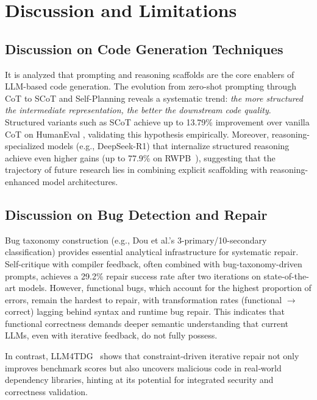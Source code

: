 \documentclass[11pt,a4paper]{article}
\begin{document}
\section{Discussion and Limitations}
\label{sec:discussion}

\subsection{Discussion on Code Generation Techniques}

It is analyzed that prompting and reasoning scaffolds are the core enablers of LLM-based code generation. The evolution from zero-shot prompting through CoT to SCoT and Self-Planning reveals a systematic trend: \textit{the more structured the intermediate representation, the better the downstream code quality}. Structured variants such as SCoT achieve up to 13.79\% improvement over vanilla CoT on HumanEval \cite{li2025scot}, validating this hypothesis empirically. Moreover, reasoning-specialized models (e.g., DeepSeek-R1) that internalize structured reasoning achieve even higher gains (up to 77.9\% on RWPB~\cite{dou2026}), suggesting that the trajectory of future research lies in combining explicit scaffolding with reasoning-enhanced model architectures.

\subsection{Discussion on Bug Detection and Repair}

Bug taxonomy construction (e.g., Dou et al.'s 3-primary/10-secondary classification) provides essential analytical infrastructure for systematic repair. Self-critique with compiler feedback, often combined with bug-taxonomy-driven prompts, achieves a 29.2\% repair success rate after two iterations on state-of-the-art models. However, functional bugs, which account for the highest proportion of errors, remain the hardest to repair, with transformation rates (functional $\to$ correct) lagging behind syntax and runtime bug repair. This indicates that functional correctness demands deeper semantic understanding that current LLMs, even with iterative feedback, do not fully possess.

In contrast, LLM4TDG~\cite{liu2025llm4tdg} shows that constraint‑driven iterative repair not only improves benchmark scores but also uncovers malicious code in real‑world dependency libraries, hinting at its potential for integrated security and correctness validation.
\end{document}
